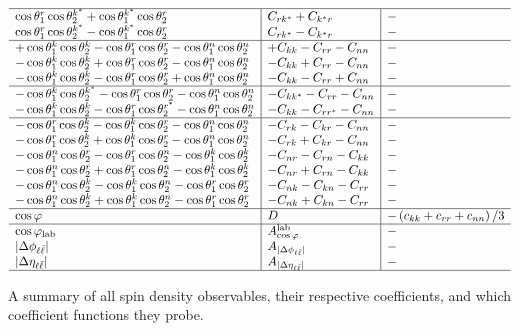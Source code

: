 \begin{table}[htb]
\begin{center}
\begin{adjustbox}{scale=0.85,center}
\begin{math}
\begin{array}{l|l|l}
\hline 
\cos \theta_1^r \cos \theta_2^{k^*} + \cos \theta_1^{k^*} \cos \theta_2^r & C_{r k^*}+C_{k^* r} & - \\
\cos \theta_1^r \cos \theta_2^{k^*} - \cos \theta_1^{k^*} \cos \theta_2^r & C_{r k^*}-C_{k^* r} & - \\
\hline 
+ \cos \theta_1^k \cos \theta_2^k - \cos \theta_1^r \cos \theta_2^r - \cos \theta_1^n \cos \theta_2^n & + C_{k k} - C_{r r} - C_{n n} & - \\
- \cos \theta_1^k \cos \theta_2^k + \cos \theta_1^r \cos \theta_2^r - \cos \theta_1^n \cos \theta_2^n & - C_{k k} + C_{r r} - C_{n n} & - \\
- \cos \theta_1^k \cos \theta_2^k - \cos \theta_1^r \cos \theta_2^r + \cos \theta_1^n \cos \theta_2^n & - C_{k k} - C_{r r} + C_{n n} & - \\
\hline 
- \cos \theta_1^k \cos \theta_2^{k^*} - \cos \theta_1^r \cos \theta_2^r - \cos \theta_1^n \cos \theta_2^n & - C_{k k^*} - C_{r r} - C_{n n} & - \\
- \cos \theta_1^k \cos \theta_2^k - \cos \theta_1^r \cos \theta_2^{r^*} - \cos \theta_1^n \cos \theta_2^n & - C_{k k} - C_{r r^*} - C_{n n} & - \\
\hline
- \cos \theta_1^r \cos \theta_2^k - \cos \theta_1^k \cos \theta_2^r - \cos \theta_1^n \cos \theta_2^n & - C_{r k} - C_{k r} - C_{n n} & - \\
- \cos \theta_1^r \cos \theta_2^k + \cos \theta_1^k \cos \theta_2^r - \cos \theta_1^n \cos \theta_2^n & - C_{r k} + C_{k r} - C_{n n} & - \\
- \cos \theta_1^n \cos \theta_2^r - \cos \theta_1^r \cos \theta_2^n - \cos \theta_1^k \cos \theta_2^k & - C_{n r} - C_{r n} - C_{k k} & - \\
- \cos \theta_1^n \cos \theta_2^r + \cos \theta_1^r \cos \theta_2^n - \cos \theta_1^k \cos \theta_2^k & - C_{n r} + C_{r n} - C_{k k} & - \\
- \cos \theta_1^n \cos \theta_2^k - \cos \theta_1^k \cos \theta_2^n - \cos \theta_1^r \cos \theta_2^r & - C_{n k} - C_{k n} - C_{r r} & - \\
- \cos \theta_1^n \cos \theta_2^k + \cos \theta_1^k \cos \theta_2^n - \cos \theta_1^r \cos \theta_2^r & - C_{n k} + C_{k n} - C_{r r} & - \\
\hline 
\cos \varphi & D & -\left(c_{k k}+c_{r r}+c_{n n}\right) / 3 \\
\hline 
\cos \varphi_{\text {lab}} & A_{\cos \varphi}^{\text {lab}} & - \\
\left\vert\Delta \phi_{\ell \bar{\ell}}\right\vert & A_{\vert \Delta \phi_{\ell \bar{\ell}}\vert} & - \\
\left\vert\Delta \eta_{\ell \bar{\ell}}\right\vert & A_{\vert \Delta \eta_{\ell \bar{\ell}}\vert} & - \\
\hline
\end{array}
\end{math}
\end{adjustbox}
\caption{A summary of all spin density observables, their respective coefficients, and which coefficient functions they probe. 
        }
\label{observables_coefficients}
\end{center}
\end{table}
